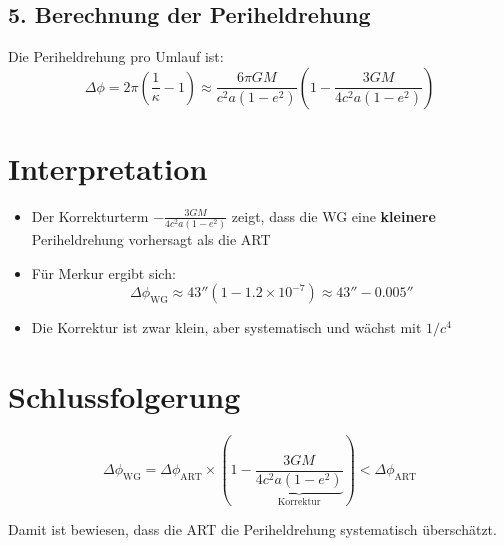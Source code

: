 \subsection*{5. Berechnung der Periheldrehung}
Die Periheldrehung pro Umlauf ist:
\begin{equation}
\Delta\phi = 2\pi\left(\frac{1}{\kappa} - 1\right) \approx \frac{6\pi GM}{c^2 a(1-e^2)}\left(1 - \frac{3GM}{4c^2 a(1-e^2)}\right)
\end{equation}

\section*{Interpretation}
\begin{itemize}
\item Der Korrekturterm $-\frac{3GM}{4c^2 a(1-e^2)}$ zeigt, dass die WG eine \textbf{kleinere} Periheldrehung vorhersagt als die ART
\item Für Merkur ergibt sich:
\[ \Delta\phi_{\text{WG}} \approx 43'' \left(1 - 1.2 \times 10^{-7}\right) \approx 43'' - 0.005'' \]
\item Die Korrektur ist zwar klein, aber systematisch und wächst mit $1/c^4$
\end{itemize}

\section*{Schlussfolgerung}
\begin{equation}
\Delta\phi_{\text{WG}} = \Delta\phi_{\text{ART}} \times \left(1 - \underbrace{\frac{3GM}{4c^2 a(1-e^2)}}_{\text{Korrektur}}\right) < \Delta\phi_{\text{ART}}
\end{equation}

Damit ist bewiesen, dass die ART die Periheldrehung systematisch überschätzt.
